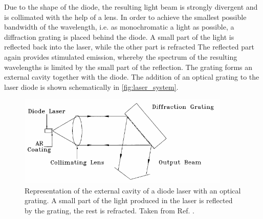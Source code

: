 Due to the shape of the diode, the resulting light beam is strongly divergent and is collimated with the help of a lens.
In order to achieve the smallest possible bandwidth of the wavelength,
i.e. as monochromatic a light as possible,
a diffraction grating is placed behind the diode.
A small part of the light is reflected back into the laser,
while the other part is refracted
The reflected part again provides stimulated emission,
whereby the spectrum of the resulting wavelengths is limited by the small part of the reflection.
The grating forms an external cavity together with the diode.
The addition of an optical grating to the laser diode is shown schematically in \autoref{fig:laser_system}.
\begin{figure}
    \centering
    \includegraphics[width=0.9\textwidth]{content/img/p8_Fig4.png}
    \caption{Representation of the external cavity of a diode laser with an optical grating.
    A small part of the light produced in the laser is reflected by the grating, the rest is refracted.
    Taken from Ref. \cite{versuchsanleitung}.}
    \label{fig:laser_system}
\end{figure}

